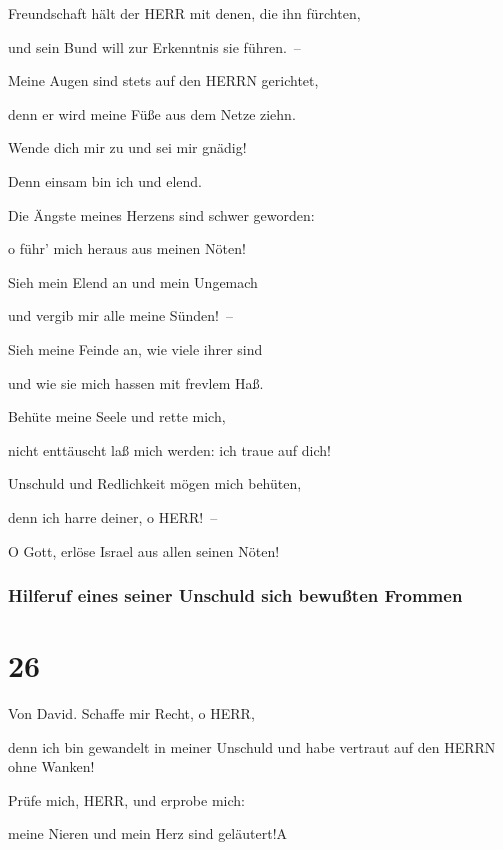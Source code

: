 Freundschaft hält der HERR mit denen, die ihn fürchten,

und sein Bund will zur Erkenntnis sie führen.~--

Meine Augen sind stets auf den HERRN gerichtet,

denn er wird meine Füße aus dem Netze ziehn.

Wende dich mir zu und sei mir gnädig!

Denn einsam bin ich und elend.

Die Ängste meines Herzens sind schwer geworden:

o führ' mich heraus aus meinen Nöten!

Sieh mein Elend an und mein Ungemach

und vergib mir alle meine Sünden!~--

Sieh meine Feinde an, wie viele ihrer sind

und wie sie mich hassen mit frevlem Haß.

Behüte meine Seele und rette mich,

nicht enttäuscht laß mich werden: ich traue auf dich!

Unschuld und Redlichkeit mögen mich behüten,

denn ich harre deiner, o HERR!~--

O Gott, erlöse Israel aus allen seinen Nöten!

\hypertarget{hilferuf-eines-seiner-unschuld-sich-bewuuxdften-frommen}{%
\subsubsection{Hilferuf eines seiner Unschuld sich bewußten
Frommen}\label{hilferuf-eines-seiner-unschuld-sich-bewuuxdften-frommen}}

\hypertarget{section-25}{%
\section{26}\label{section-25}}

Von David. Schaffe mir Recht, o HERR,

denn ich bin gewandelt in meiner Unschuld und habe vertraut auf den
HERRN ohne Wanken!

Prüfe mich, HERR, und erprobe mich:

meine Nieren und mein Herz sind geläutert!{A}

